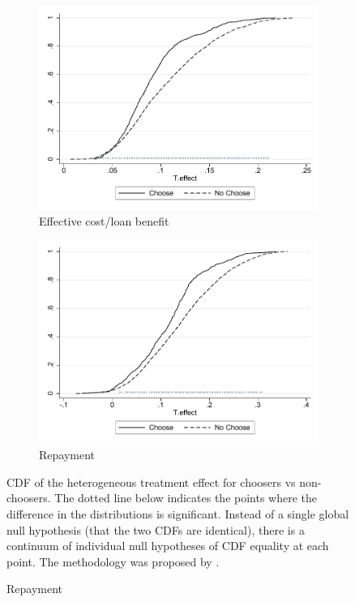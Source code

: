 \documentclass[oneside,11pt]{article}
\begin{document}
\begin{figure}[H]
    \caption{Negative selection on treatment effects}
    \label{benefit_vs_choice_cdf}
    \begin{center}
    \begin{subfigure}{0.475\textwidth}
        \caption{Effective cost/loan benefit}
        \centering
        \includegraphics[width=\textwidth]{Figuras/cdf_predchoose_tau_eff.pdf}
    \end{subfigure}
    \begin{subfigure}{0.475\textwidth}
        \caption{Repayment}
        \centering
        \includegraphics[width=\textwidth]{Figuras/cdf_predchoose_tau_des.pdf}
    \end{subfigure}
  
    \end{center}
     \scriptsize    CDF of the heterogeneous treatment effect for choosers vs non-choosers. The dotted line below indicates the points where the difference in the distributions is significant.  Instead of a single global null hypothesis (that the two CDFs are identical), there is a continuum of individual null hypotheses of CDF equality at each point. The methodology was proposed by \cite{GOLDMAN2018143}.

 

\end{figure}
\end{document}
